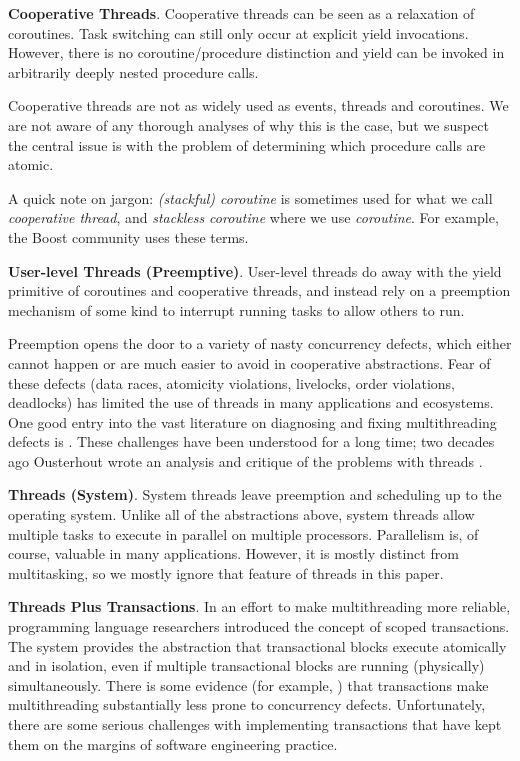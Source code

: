 \documentclass[9pt,preprint]{sigplanconf}
\begin{document}
\textbf{Cooperative Threads}.
Cooperative threads can be seen as a relaxation of coroutines.
Task switching can still only occur at explicit yield invocations.
However, there is no coroutine/procedure distinction and yield can be invoked in arbitrarily deeply nested procedure calls.

Cooperative threads are not as widely used as events, threads and coroutines.
We are not aware of any thorough analyses of why this is the case, but we suspect the central issue is with the problem of determining which procedure calls are atomic.

A quick note on jargon: \emph{(stackful) coroutine} is sometimes used for what we call \emph{cooperative thread}, and \emph{stackless coroutine} where we use \emph{coroutine}.
For example, the Boost community uses these terms.

\textbf{User-level Threads (Preemptive)}.
User-level threads do away with the yield primitive of coroutines and cooperative threads, and instead rely on a preemption mechanism of some kind to interrupt running tasks to allow others to run.

Preemption opens the door to a variety of nasty concurrency defects, which either cannot happen or are much easier to avoid in cooperative abstractions.
Fear of these defects (data races, atomicity violations, livelocks, order violations, deadlocks) has limited the use of threads in many applications and ecosystems.
One good entry into the vast literature on diagnosing and fixing multithreading defects is \cite{Lu2008}.
These challenges have been understood for a long time; two decades ago Ousterhout wrote an analysis and critique of the problems with threads \cite{Ousterhout1996}.

\textbf{Threads (System)}.
System threads leave preemption and scheduling up to the operating system.
Unlike all of the abstractions above, system threads allow multiple tasks to execute in parallel on multiple processors.
Parallelism is, of course, valuable in many applications.
However, it is mostly distinct from multitasking, so we mostly ignore that feature of threads in this paper.

\textbf{Threads Plus Transactions}.
In an effort to make multithreading more reliable, programming language researchers introduced the concept of scoped transactions.
The system provides the abstraction that transactional blocks execute atomically and in isolation, even if multiple transactional blocks are running (physically) simultaneously.
There is some evidence (for example, \cite{Pankratius2014}) that transactions make multithreading substantially less prone to concurrency defects.
Unfortunately, there are some serious challenges with implementing transactions that have kept them on the margins of software engineering practice.
\end{document}
